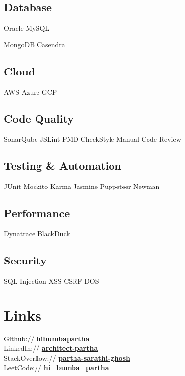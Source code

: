 \documentclass[]{deedy-resume-openfont}
\begin{document}
\begin{minipage}[t]{0.33\textwidth}
\subsection{Database}
Oracle \textbullet{} 
MySQL

MongoDB \textbullet{}
Casendra
\sectionsep

\subsection{Cloud}
AWS \textbullet{} 
Azure \textbullet{}
GCP
\sectionsep

\subsection{Code Quality}
SonarQube \textbullet{} 
JSLint \textbullet{}
PMD \textbullet{}
CheckStyle \textbullet{}
Manual Code Review 
\sectionsep

\subsection{Testing \& Automation}
JUnit \textbullet{}  
Mockito \textbullet{} 
Karma \textbullet{}
Jasmine \textbullet{}
Puppeteer \textbullet{}
Newman
\sectionsep

\subsection{Performance}
Dynatrace \textbullet{} 
BlackDuck
\sectionsep

\subsection{Security}
SQL Injection \textbullet{} 
XSS \textbullet{} 
CSRF \textbullet{} 
DOS


\section{Links} 
Github:// \href{https://github.com/hibumbapartha}{\bf hibumbapartha} \\
LinkedIn://  \href{https://www.linkedin.com/in/architect-partha/}{\bf architect-partha} \\
StackOverflow://  \href{https://stackoverflow.com/users/4943598/partha-sarathi-ghosh}{\bf partha-sarathi-ghosh} \\
LeetCode://  \href{https://leetcode.com/hi_bumba_partha/}{\bf hi\_bumba\_partha}

%
%

\end{minipage} 
\end{document}
